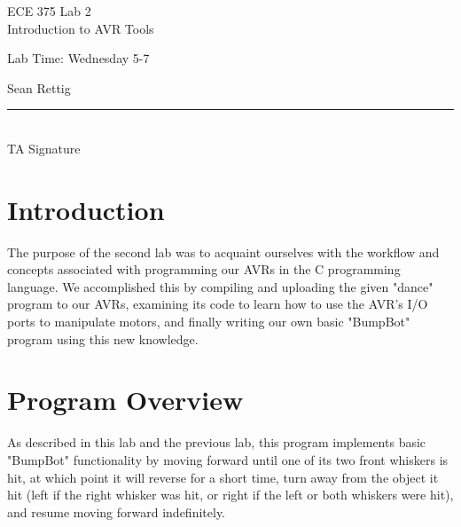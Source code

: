 \documentclass[12pt,letterpaper]{article}
\begin{document}
\begin{titlepage}
    \vspace*{4cm}
    \begin{flushright}
    {\huge
        ECE 375 Lab 2\\[1cm]
    }
    {\large
        Introduction to AVR Tools
    }
    \end{flushright}
    \begin{flushleft}
    Lab Time: Wednesday 5-7
    \end{flushleft}
    \begin{flushright}
    Sean Rettig
    \vfill
    \rule{5in}{.5mm}\\
    TA Signature
    \end{flushright}

\end{titlepage}

\section{Introduction}

The purpose of the second lab was to acquaint ourselves with the workflow and
concepts associated with programming our AVRs in the C programming language.
We accomplished this by compiling and uploading the given "dance" program to
our AVRs, examining its code to learn how to use the AVR's I/O ports to
manipulate motors, and finally writing our own basic "BumpBot" program using
this new knowledge.

\section{Program Overview}

As described in this lab and the previous lab, this program implements basic
"BumpBot" functionality by moving forward until one of its two front whiskers
is hit, at which point it will reverse for a short time, turn away from the
object it hit (left if the right whisker was hit, or right if the left or both
whiskers were hit), and resume moving forward indefinitely.
\end{document}
